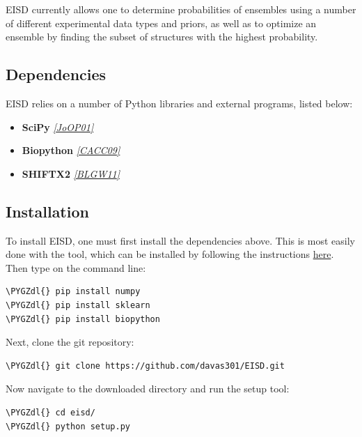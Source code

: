 \documentclass[letterpaper,10pt,english]{sphinxmanual}
\def\PYGZdl{\char`\$}
\begin{document}
EISD currently allows one to determine probabilities of ensembles using
a number of different experimental data types and priors, as well as to
optimize an ensemble by finding the subset of structures with the highest
probability.


\subsection{Dependencies}
\label{intro:dependencies}
EISD relies on a number of Python libraries and external programs, listed
below:
\begin{itemize}
\item {} 
\textbf{SciPy} \label{intro:id2}{\hyperref[references:joop01]{\emph{{[}JoOP01{]}}}}

\item {} 
\textbf{Biopython} \label{intro:id3}{\hyperref[references:cacc09]{\emph{{[}CACC09{]}}}}

\item {} 
\textbf{SHIFTX2} \label{intro:id4}{\hyperref[references:blgw11]{\emph{{[}BLGW11{]}}}}

\end{itemize}


\subsection{Installation}
\label{intro:installation}
To install EISD, one must first install the dependencies above. This is most
easily done with the  tool, which can be installed by following the
instructions \href{https://pip.pypa.io/en/stable/installing/}{here}. Then type on the command line:

\begin{Verbatim}[commandchars=\\\{\}]
\PYGZdl{} pip install numpy
\PYGZdl{} pip install sklearn
\PYGZdl{} pip install biopython
\end{Verbatim}

Next, clone the git repository:

\begin{Verbatim}[commandchars=\\\{\}]
\PYGZdl{} git clone https://github.com/davas301/EISD.git
\end{Verbatim}

Now navigate to the downloaded directory and run the setup tool:

\begin{Verbatim}[commandchars=\\\{\}]
\PYGZdl{} cd eisd/
\PYGZdl{} python setup.py
\end{Verbatim}
\end{document}
